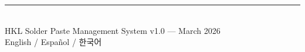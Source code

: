 \documentclass[12pt,a4paper]{article}
\begin{document}
\vfill
\begin{center}
\textcolor{hklgray}{\rule{0.5\textwidth}{0.4pt}}\\
\vspace{0.3cm}
{\small\textcolor{hklgray}{HKL Solder Paste Management System v1.0 — March 2026}}\\
{\footnotesize\textcolor{hklgray}{English / Español / 한국어}}
\end{center}
\end{document}
